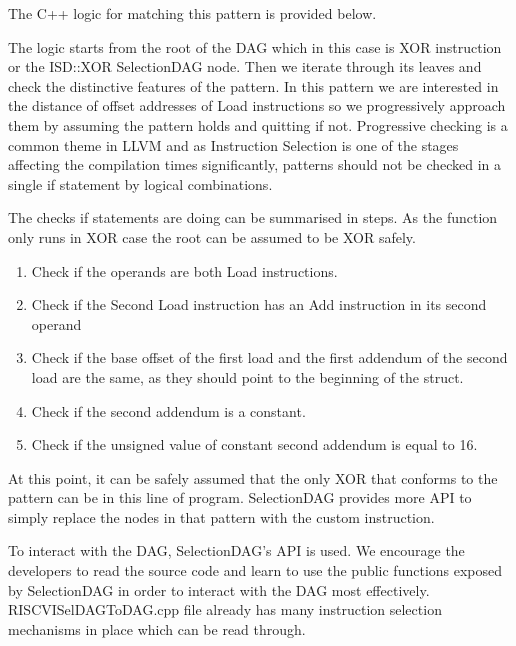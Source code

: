 


The C++ logic for matching this pattern is provided below.



The logic starts from the root of the DAG which in this case is XOR instruction or the ISD::XOR SelectionDAG node. Then we iterate through its leaves and check the distinctive features of the pattern. In this pattern we are interested in the distance of offset addresses of Load instructions so we progressively approach them by assuming the pattern holds and quitting if not. Progressive checking is a common theme in LLVM and as Instruction Selection is one of the stages affecting the compilation times significantly, patterns should not be checked in a single if statement by logical combinations. 

The checks if statements are doing can be summarised in steps. As the function only runs in XOR case the root can be assumed to be XOR safely.
\begin{enumerate}
    \item Check if the operands are both Load instructions.
    \item Check if the Second Load instruction has an Add instruction in its second operand
    \item Check if the base offset of the first load and the first addendum of the second load are the same, as they should point to the beginning of the struct.
    \item Check if the second addendum is a constant.
    \item Check if the unsigned value of constant second addendum is equal to 16.
\end{enumerate}

At this point, it can be safely assumed that the only XOR that conforms to the pattern can be in this line of program. SelectionDAG provides more API to simply replace the nodes in that pattern with the custom instruction.


To interact with the DAG, SelectionDAG's API is used. We encourage the developers to read the source code and learn to use the public functions exposed by SelectionDAG in order to interact with the DAG most effectively. RISCVISelDAGToDAG.cpp file already has many instruction selection mechanisms in place which can be read through. 

